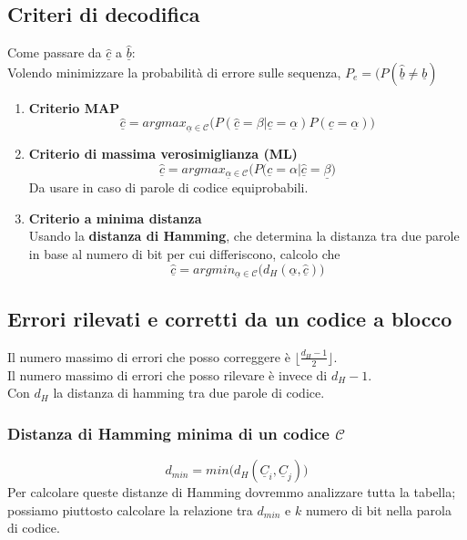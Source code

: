 \documentclass{article}
\begin{document}
\subsection{Criteri di decodifica}
Come passare da $\underline{\hat{c}}$ a $\underline{\hat{b}}$:\\
Volendo minimizzare la probabilità di errore sulle sequenza, $P_e=(P(\underline{\hat{b}}\neq\underline{b})$
\begin{enumerate}
	\item \textbf{Criterio MAP}\\
	$$\underline{\hat{c}}=argmax_{\underline{\alpha}\in\mathcal{C}}\big(P(\underline{\hat{c}}=\beta|\underline{c}=\underline{\alpha})P(\underline{c}=\underline{\alpha})\big)$$
	\item \textbf{Criterio di massima verosimiglianza (ML)}
	$$\underline{\hat{c}}=argmax_{\underline{\alpha}\in\mathcal{C}}\big(P(\underline{c}=\alpha|\underline{\hat{c}}=\underline{\beta}\big)$$
	Da usare in caso di parole di codice equiprobabili.
	\item \textbf{Criterio a minima distanza}\\
	Usando la \textbf{distanza di Hamming}, che determina la distanza tra due parole in base al numero di bit per cui differiscono, calcolo che
	$$\underline{\hat{c}}=argmin_{\underline{\alpha}\in\mathcal{C}}\big(d_H(\underline{\alpha},\underline{\hat{c}})\big)$$
\end{enumerate}

\subsection{Errori rilevati e corretti da un codice a blocco}
Il numero massimo di errori che posso correggere è $\lfloor\frac{d_H-1}{2}\rfloor$.\\
Il numero massimo di errori che posso rilevare è invece di $d_H-1$.\\
Con $d_H$ la distanza di hamming tra due parole di codice.

\subsubsection{Distanza di Hamming minima di un codice $\mathcal{C}$}
$$d_{min}=min\big(d_H(\underline{C}_i,\underline{C}_j)\big)$$
Per calcolare queste distanze di Hamming dovremmo analizzare tutta la tabella; possiamo piuttosto calcolare la relazione tra $d_{min}$ e $k$ numero di bit nella parola di codice.
\end{document}
